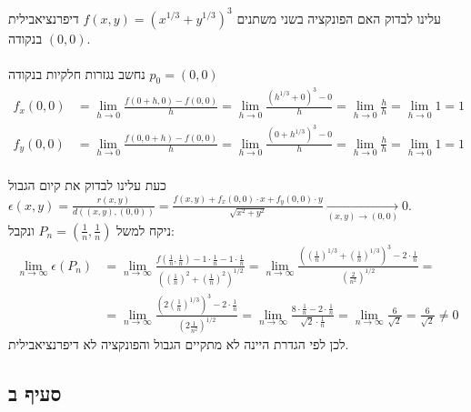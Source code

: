 \documentclass{article}
\begin{document}
עלינו לבדוק האם הפונקציה בשני משתנים $f(x,y)=(x^{1/3}+y^{1/3})^3$ דיפרנציאבילית בנקודה $(0,0)$.\\\\
נחשב נגזרות חלקיות בנקודה $p_0=(0,0)$
\begin{align*}
    f_x(0,0) & =\lim_{h\rightarrow 0} \frac{f(0+h, 0)-f(0,0)}{h}=
    \lim_{h\rightarrow 0} \frac{(h^{1/3}+0)^3-0}{h}=
    \lim_{h\rightarrow 0} \frac{h}{h}=
    \lim_{h\rightarrow 0} 1=
    1                                                               \\
    f_y(0,0) & = \lim_{h\rightarrow 0} \frac{f(0, 0+h)-f(0,0)}{h} =
    \lim_{h\rightarrow 0} \frac{(0+h^{1/3})^3-0}{h} =
    \lim_{h\rightarrow 0} \frac{h}{h}=
    \lim_{h\rightarrow 0} 1=
    1
\end{align*}
\\
כעת עלינו לבדוק את קיום הגבול $\epsilon(x,y)=\frac{r(x,y)}{d((x,y),(0,0))}=\frac{f(x,y)+f_x(0,0)\cdot x+f_y(0,0)\cdot y}{\sqrt{x^2+y^2}}\xrightarrow[(x,y)\rightarrow (0,0)]{}0$. \\
ניקח למשל $P_n=(\frac{1}{n}, \frac{1}{n})$ ונקבל:
\begin{align*}
    \lim_{n\rightarrow\infty} \epsilon(P_n) & =
    \lim_{n\rightarrow\infty} \frac{f(\frac{1}{n},\frac{1}{n})-1\cdot \frac{1}{n}-1\cdot \frac{1}{n}}{((\frac{1}{n})^2+(\frac{1}{n})^2)^{1/2}}=
    \lim_{n\rightarrow\infty} \frac{((\frac{1}{n})^{1/3}+(\frac{1}{n})^{1/3})^3- 2\cdot \frac{1}{n}}{(\frac{2}{n^2})^{1/2}}=                          \\
                                            & = \lim_{n\rightarrow\infty} \frac{(2(\frac{1}{n})^{1/3})^3-2\cdot \frac{1}{n}}{(2\frac{1}{n^2})^{1/2}}=
    \lim_{n\rightarrow\infty} \frac{8\cdot \frac{1}{n}- 2\cdot \frac{1}{n}}{\sqrt{2}\cdot \frac{1}{n}}=
    \lim_{n\rightarrow\infty} \frac{6}{\sqrt{2}}=
    \frac{6}{\sqrt{2}}\ne 0
\end{align*}
לכן לפי הגדרת היינה לא מתקיים הגבול והפונקציה לא דיפרנציאבילית.

\subsection*{סעיף ב}
\end{document}
